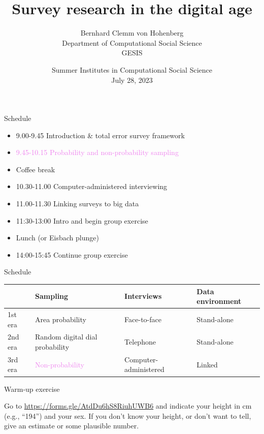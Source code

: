 \documentclass[aspectratio=169]{beamer}
\title[]{Survey research in the digital age}
\author[]{Bernhard Clemm von Hohenberg\\Department of Computational Social Science\\GESIS}
\date[]{Summer Institutes in Computational Social Science\\July 28, 2023}
\begin{document}
\frame{\titlepage}

\begin{frame}{Schedule}

\vspace{0.5em}
\begin{itemize}
\item 9.00-9.45 Introduction \& total error survey framework
\item \textcolor{violet}{9.45-10.15 Probability and non-probability sampling}
\vspace{0.5em}
\item Coffee break
\vspace{0.5em}
\item 10.30-11.00 Computer-administered interviewing
\item 11.00-11.30 Linking surveys to big data
\item 11:30-13:00 Intro and begin group exercise
\vspace{0.5em}
\item Lunch (or Eisbach plunge)
\vspace{0.5em}
\item 14:00-15:45 Continue group exercise
\end{itemize}

\end{frame}
\begin{frame}{Schedule}
\begin{center}
\renewcommand{\arraystretch}{1.5}
\begin{tabular}{p{}p{}p{}p{}}
& \textbf{Sampling} & \textbf{Interviews} & \textbf{Data environment}\\
\hline \hline
1st era & Area probability & Face-to-face & Stand-alone \\
\hline
2nd era & Random digital dial probability & Telephone & Stand-alone \\
\hline
3rd era & \textcolor{violet}{Non-probability} & Computer-administered  & Linked \\
\end{tabular}
\end{center}

\end{frame}
\begin{frame}{Warm-up exercise}

Go to \url{https://forms.gle/AtdDu6hS8RiuhUWB6} and indicate your height in cm (e.g., ``194'') and your sex. If you don't know your height, or don't want to tell, give an estimate or some plausible number. 

\end{frame}
\end{document}
